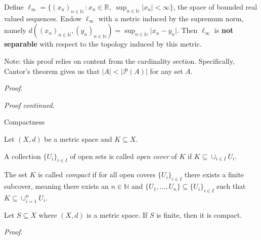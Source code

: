 \documentclass [aspectratio=169]{beamer}
\newcommand{\R}{{\mathbb{R}}}
\newcommand{\N}{{\mathbb{N}}}
\newcommand{\cP}{\mathcal{P}}
\begin{document}
\begin{frame}
\begin{example}
Define $\ell_\infty=\{ (x_n)_{n\in \N} \, : x_n \in \R , \; \sup_{n\in \N} \vert x_n \vert <\infty \}$, the space of bounded real valued sequences. Endow $\ell_\infty$ with a metric induced by the supremum norm, namely $d((x_n)_{n\in \N}, (y_n)_{n\in \N}) = \sup_{n\in \N} \vert x_n-y_n\vert$. 
Then $\ell_\infty$ is \textbf{not separable} with respect to the topology induced by this metric. 
\end{example}

\vspace{0.5em}
Note: this proof relies on content from the cardinality section. Specifically, Cantor's theorem gives us that $|A| < |\cP(A)|$ for any set $A$.

\vspace{0.5em}
\textit{Proof}.
\vspace{2.5cm}

\end{frame}


\begin{frame}
\textit{Proof continued}.
\vspace{7cm}

\end{frame}



\begin{frame}{Compactness}
\begin{definition}
Let $(X,d)$ be a metric space and $K\subseteq X$. 

\vspace{0.5em}

A collection $\{U_i\}_{i\in I} $ of open sets is called \emph{open cover} of $K$ if $K\subseteq \cup_{i\in I} U_i$. 

\vspace{0.5em}

The set $K$ is called \emph{compact} if for all open covers $\{U_i\}_{i\in I}$ there exists a finite subcover, meaning there exists an $n\in \N$ and $\{U_1,\ldots,U_n\}\subseteq \{U_i\}_{i\in I}$ such that $K\subseteq \cup_{i=1}^n U_i$.
\end{definition}
\end{frame}


\begin{frame}

\begin{example}
Let $S\subseteq X$ where $(X,d)$ is a metric space. If $S$ is finite, then it is compact. 
\end{example}
\textit{Proof.}
\vspace{4cm}
\end{frame}
\end{document}
